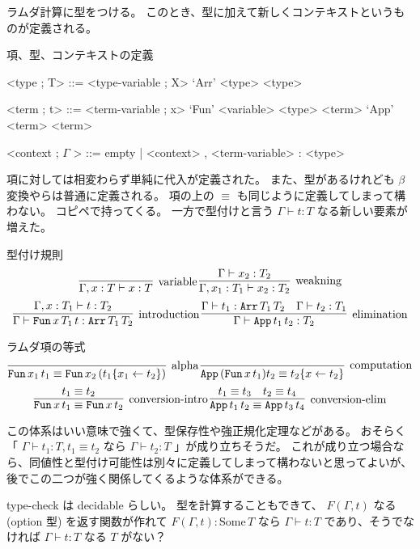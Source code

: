 ラムダ計算に型をつける。
このとき、型に加えて新しくコンテキストというものが定義される。
\begin{itembox}[l]{項、型、コンテキストの定義}
\begin{grammar}
  <type ; T> ::= <type-variable ; X>
  \alt `Arr' <type> <type>

  <term ; t> ::= <term-variable ; x>
  \alt `Fun' <variable> <type> <term>
  \alt `App' <term> <term>

  <context ; \(\Gamma\) > ::= empty | <context> ,  <term-variable> : <type>
\end{grammar}
\end{itembox}

項に対しては相変わらず単純に代入が定義された。
また、型があるけれども \(\beta\) 変換やらは普通に定義される。
項の上の \(\equiv\) も同じように定義してしまって構わない。
コピペで持ってくる。
一方で型付けと言う \(\Gamma \vdash t : T\) なる新しい要素が増えた。

\begin{itembox}[l]{型付け規則}
  \[
    \infer[\text{variable}]{\Gamma , x : T \vdash x : T}{} \,
    \infer[\text{weakning}]{\Gamma , x_1 : T_1 \vdash x_2 : T_2}{\Gamma \vdash x_2 : T_2}\]
  \[
    \infer[\text{introduction}]{\Gamma \vdash \texttt{Fun} \, x \, T_1 \, t : \texttt{Arr} \, T_1 \, T_2}{\Gamma , x : T_1 \vdash t : T_2} \,
    \infer[\text{elimination}]{\Gamma \vdash \texttt{App} \, t_1 \, t_2 : T_2}{\Gamma \vdash t_1 : \texttt{Arr} \, T_1 \, T_2 & \Gamma \vdash t_2 : T_1}\]
\end{itembox}

\begin{itembox}[l]{ラムダ項の等式}
  \[
    \infer[\text{alpha}]{\texttt{Fun} \, x_1 \, t_1 \equiv \texttt{Fun} \, x_2 \, (t_1\{x_1 \leftarrow t_2\})}{} \,
    \infer[\text{computation}]{\texttt{App} \, (\texttt{Fun} \, x \, t_1) t_2 \equiv t_2\{x \leftarrow t_2\}}{}\]
  \[
    \infer[\text{conversion-intro}]{\texttt{Fun} \, x \, t_1 \equiv \texttt{Fun} \, x \, t_2}{t_1 \equiv t_2} \,
    \infer[\text{conversion-elim}]{\texttt{App} \, t_1 \, t_2 \equiv \texttt{App} \, t_3 \, t_4}{t_1 \equiv t_3 & t_2 \equiv t_4} \]
\end{itembox}

この体系はいい意味で強くて、型保存性や強正規化定理などがある。
おそらく「 \(\Gamma \vdash t_1 : T , t_1 \equiv t_2\) なら \(\Gamma \vdash t_2 : T\) 」が成り立ちそうだ。
これが成り立つ場合なら、同値性と型付け可能性は別々に定義してしまって構わないと思ってよいが、後でこの二つが強く関係してくるような体系ができる。

type-check は decidable らしい。
型を計算することもできて、 \(F(\Gamma , t)\) なる (option 型) を返す関数が作れて \(F(\Gamma , t) : \text{Some} \, T\) なら \(\Gamma \vdash t : T\) であり、そうでなければ \(\Gamma \vdash t : T\) なる \(T\) がない？